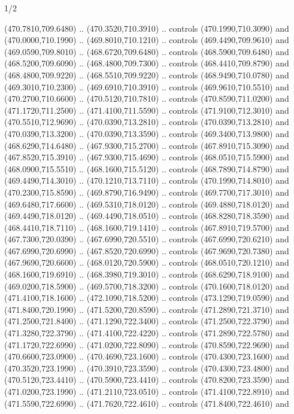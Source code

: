 \begin{flagdescription}{1/2}
\begin{scope}[xshift=0.5\flaglength]
\begin{scope}[scale=0.00745\flagwidth,xshift=-12.1mm,yshift=41.7mm]
\begin{scope}[y=0.80pt, x=0.80pt, yscale=-1, xscale=1, inner sep=0pt, outer sep=0pt]
\begin{scope}[cm={{1.33333,0.0,0.0,-1.33333,(0.0,114.66667)}}]
\begin{scope}[scale=0.100]
  (470.7810,709.6480) .. (470.3520,710.3910) .. controls (470.1990,710.3090) and
  (470.0000,710.1990) .. (469.8010,710.1210) .. controls (469.4490,709.9610) and
  (469.0590,709.8010) .. (468.6720,709.6480) .. controls (468.5900,709.6480) and
  (468.5200,709.6090) .. (468.4800,709.7300) .. controls (468.4410,709.8790) and
  (468.4800,709.9220) .. (468.5510,709.9220) .. controls (468.9490,710.0780) and
  (469.3010,710.2300) .. (469.6910,710.3910) .. controls (469.9610,710.5510) and
  (470.2700,710.6600) .. (470.5120,710.7810) .. controls (470.8590,711.0200) and
  (471.1720,711.2500) .. (471.4100,711.5590) .. controls (471.9100,712.3010) and
  (470.5510,712.9690) .. (470.0390,713.2810) .. controls (470.0390,713.2810) and
  (470.0390,713.3200) .. (470.0390,713.3590) .. controls (469.3400,713.9800) and
  (468.6290,714.6480) .. (467.9300,715.2700) .. controls (467.8910,715.3090) and
  (467.8520,715.3910) .. (467.9300,715.4690) .. controls (468.0510,715.5900) and
  (468.0900,715.5510) .. (468.1600,715.5120) .. controls (468.7890,714.8790) and
  (469.4490,714.3010) .. (470.1210,713.7110) .. controls (470.1990,714.8010) and
  (470.2300,715.8590) .. (469.8790,716.9490) .. controls (469.7700,717.3010) and
  (469.6480,717.6600) .. (469.5310,718.0120) .. controls (469.4880,718.0120) and
  (469.4490,718.0120) .. (469.4490,718.0510) .. controls (468.8280,718.3590) and
  (468.4410,718.7110) .. (468.1600,719.1410) .. controls (467.8910,719.5700) and
  (467.7300,720.0390) .. (467.6990,720.5510) .. controls (467.6990,720.6210) and
  (467.6990,720.6990) .. (467.8520,720.6990) .. controls (467.9690,720.7380) and
  (467.9690,720.6600) .. (468.0120,720.5900) .. controls (468.0510,720.1210) and
  (468.1600,719.6910) .. (468.3980,719.3010) .. controls (468.6290,718.9100) and
  (469.0200,718.5900) .. (469.5700,718.3200) .. controls (470.1600,718.0120) and
  (471.4100,718.1600) .. (472.1090,718.5200) .. controls (473.1290,719.0590) and
  (471.8400,720.1990) .. (471.5200,720.8590) .. controls (471.2890,721.3710) and
  (471.2500,721.8400) .. (471.1290,722.3400) .. controls (471.2500,722.3790) and
  (471.3280,722.3790) .. (471.4100,722.4220) .. controls (471.2890,722.5780) and
  (471.1720,722.6990) .. (471.0200,722.8090) .. controls (470.8590,722.9690) and
  (470.6600,723.0900) .. (470.4690,723.1600) .. controls (470.4300,723.1600) and
  (470.3520,723.1990) .. (470.3910,723.3590) .. controls (470.4300,723.4800) and
  (470.5120,723.4410) .. (470.5900,723.4410) .. controls (470.8200,723.3590) and
  (471.0200,723.1990) .. (471.2110,723.0510) .. controls (471.4100,722.8910) and
  (471.5590,722.6990) .. (471.7620,722.4610) .. controls (471.8400,722.4610) and

\end{scope}
\end{scope}
\end{scope}
\end{scope}
\end{scope}
\end{flagdescription}
